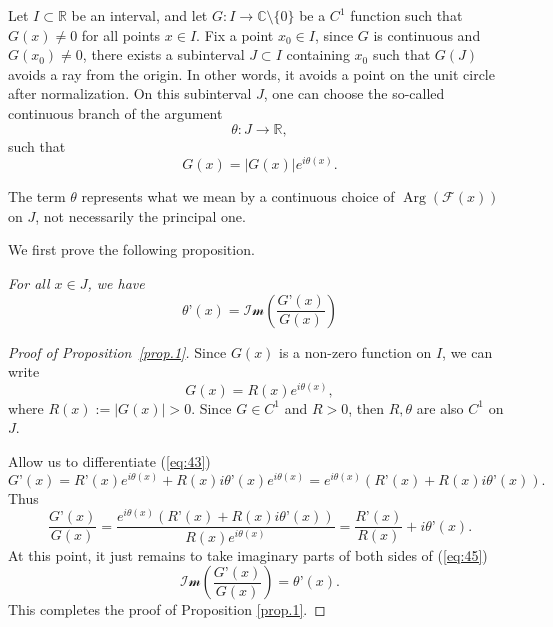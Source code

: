\documentclass[preprint,12pt,nopreprintline]{elsarticle}
\begin{document}
Let $I\subset\mathbb{R}$ be an interval, and let $G:I\longrightarrow\mathbb{C}\setminus\{0\}$ be a $C^1$ function such that $G\left(x\right)\neq 0$ for all points $x\in I$. Fix a point $x_0\in I$, since $G$ is continuous and $G\left(x_0\right)\neq 0$, there exists a subinterval $J\subset I$ containing $x_0$ such that $G\left(J\right)$ avoids a ray from the origin. In other words, it avoids a point on the unit circle after normalization. On this subinterval $J$, one can choose the so-called continuous branch of the argument 
\begin{equation}\label{eq:40}
\theta:J\longrightarrow\mathbb{R},
\end{equation}
such that
\begin{equation}\label{eq:41}
G\left(x\right)=\vert G\left(x\right)\vert e^{i\theta\left(x\right)}.
\end{equation}

The term $\theta$ represents what we mean by a continuous choice of $\operatorname{Arg}\left(\mathscr{F}\left(x\right)\right)$ on $J$, not necessarily the principal one.

We first prove the following proposition.
\begin{prop}\label{prop.1}
\textit{For all $x\in J$, we have}
\begin{equation}\label{eq:42}
\theta’\left(x\right)=\mathscr{Im}\left(\frac{G’\left(x\right)}{G\left(x\right)}\right)
\end{equation}
\end{prop}

\begin{proof}[Proof of Proposition~\ref{prop.1}]\normalfont
Since $G\left(x\right)$ is a non-zero function on $I$, we can write
\begin{equation}\label{eq:43}
G\left(x\right)=R\left(x\right)e^{i\theta\left(x\right)},
\end{equation}
where $R\left(x\right):=\vert G\left(x\right)\vert>0$. Since $G\in C^1$ and $R>0$, then $R,\theta$ are also $C^1$ on $J$.

Allow us to differentiate (\ref{eq:43})
\begin{equation}\label{eq:44}
G’\left(x\right)=R’\left(x\right)e^{i\theta\left(x\right)}+R\left(x\right)i\theta’\left(x\right)e^{i\theta\left(x\right)}=e^{i\theta\left(x\right)}\left(R’\left(x\right)+R\left(x\right)i\theta’\left(x\right)\right).
\end{equation}
Thus
\begin{equation}\label{eq:45}
\frac{G’\left(x\right)}{G\left(x\right)}=\frac{e^{i\theta\left(x\right)}\left(R’\left(x\right)+R\left(x\right)i\theta’\left(x\right)\right)}{R\left(x\right)e^{i\theta\left(x\right)}}=\frac{R’\left(x\right)}{R\left(x\right)}+i\theta’\left(x\right).
\end{equation}
At this point, it just remains to take imaginary parts of both sides of (\ref{eq:45})
\begin{equation}\label{eq:46}
\mathscr{Im}\left(\frac{G’\left(x\right)}{G\left(x\right)}\right)=\theta’\left(x\right).
\end{equation}
This completes the proof of Proposition \ref{prop.1}.
\end{proof}
\end{document}
